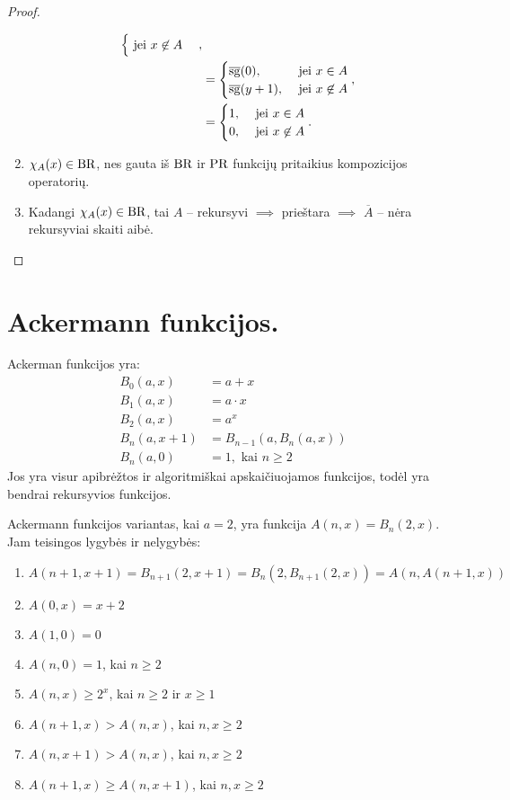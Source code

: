 \begin{prop}
\begin{proof}
\begin{enumerate}
\begin{align*}
\begin{cases}
              \text{ jei } x \not \in A
          \end{cases},\\
          &=%
          \begin{cases}
            \sgi(0), & \text{ jei } x \in A \\
            \sgi(y+1), & \text{ jei } x \not \in A
          \end{cases},\\
          &=%
          \begin{cases}
            1, & \text{ jei } x \in A \\
            0, & \text{ jei } x \not \in A
          \end{cases}.
        \end{align*}
      \item $\chi_{A}(x) \in \mathop{\text{BR}}$, nes gauta iš $\mathop{\text{BR}}$ ir $\mathop{\text{PR}}$ funkcijų
        pritaikius kompozicijos operatorių.
      \item Kadangi $\chi_{A}(x) \in \mathop{\text{BR}}$, tai $A$ – rekursyvi 
        $\implies$ prieštara $\implies$ $\overline{A}$ – nėra rekursyviai
        skaiti aibė.
    \end{enumerate}
  \end{proof}
\end{prop}

\section{Ackermann funkcijos.}

Ackerman funkcijos yra:
\begin{align*}
  B_{0}(a, x) &= a + x \\
  B_{1}(a, x) &= a \cdot x \\
  B_{2}(a, x) &= a^{x} \\
  B_{n}(a, x+1) &= B_{n-1}(a, B_{n}(a, x)) \\
  B_{n}(a, 0) &= 1, \text{ kai } n \geq 2
\end{align*}
Jos yra visur apibrėžtos ir algoritmiškai apskaičiuojamos funkcijos, todėl
yra bendrai rekursyvios funkcijos.

Ackermann funkcijos variantas, kai $a=2$, yra funkcija 
$A(n,x) = B_{n}(2, x)$. Jam teisingos lygybės ir nelygybės:
\begin{enumerate}
  \item $A(n+1,x+1) = B_{n+1}(2, x+1) = B_{n}(2, B_{n+1}(2, x)) = %
    A(n, A(n+1, x))$
  \item $A(0,x) = x+2$
  \item $A(1,0) = 0$
  \item $A(n,0) = 1$, kai $n \geq 2$
  \item $A(n,x) \geq 2^{x}$, kai $n \geq 2$ ir $x \geq 1$
  \item $A(n+1,x) > A(n,x)$, kai $n,x \geq 2$
  \item $A(n,x+1) > A(n,x)$, kai $n,x \geq 2$
  \item $A(n+1,x) \geq A(n,x+1)$, kai $n,x \geq 2$
\end{enumerate}

